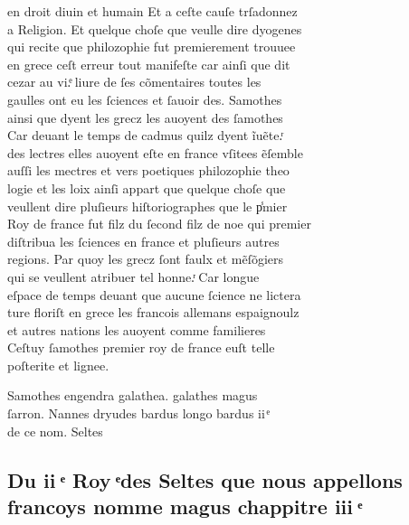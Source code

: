 \documentclass[12pt]{article}
\begin{document}
en droit diuin et humain Et a ceſte cauſe trſadonnez\\
a Religion. Et
          quelque choſe que veulle dire dyogenes\\
qui recite que philozophie fut premierement trouuee\\
en grece ceſt erreur tout
          manifeſte car ainſi que dit\\
cezar au vi.ͤ liure de ſes cõmentaires toutes les\\
gaulles ont eu les ſciences et ſauoir des. Samothes\\
ainsi que dyent les grecz les auoyent des ſamothes\\
Car deuant le temps de cadmus quilz dyent ĩuẽte.ͬ\\
des lectres elles auoyent eſte en france vſitees ẽſemble\\
auſſi les
          mectres et vers poetiques philozophie theo\\
logie et les loix ainſi appart que
          quelque choſe que\\
veullent dire pluſieurs hiſtoriographes que le p̾mier\\
Roy de france fut filz du ſecond filz de noe qui
            premier\\
diſtribua les ſciences en france et pluſieurs autres\\
regions. Par quoy les grecz ſont faulx et mẽſõgiers\\
qui se veullent
          atribuer tel honne.ͬ Car longue\\
eſpace de temps deuant que aucune ſcience ne
            lictera\\
ture floriſt en grece les francois allemans espaignoulz\\
et
          autres nations les auoyent comme familieres\\
Ceſtuy ſamothes premier roy de france euſt telle\\
poſterite et
          lignee.



Samothes engendra galathea. galathes magus\\
ſarron. Nannes dryudes bardus longo bardus ii ͤ\\
de ce nom.
          Seltes





\subsection*{Du ii ͤ Roy ͤdes Seltes que nous appellons\protect\\ francoys nomme
            magus chappitre iii ͤ}
\end{document}
